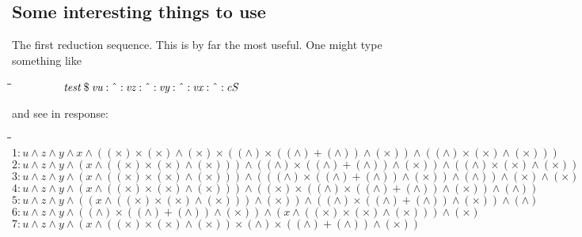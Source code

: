 \documentclass{article}
\newlength{\lwidth}\setlength{\lwidth}{4.5cm}
\newlength{\cwidth}\setlength{\cwidth}{8mm} %
\newcommand{\Varid}[1]{\mathit{#1}}
\begin{document}
\subsection{Some interesting things to use}

The first reduction sequence. This is by far the most useful. One might type something like
\begin{tabbing}
\qquad\=\hspace{\lwidth}\=\hspace{\cwidth}\=\+\kill
${\phantom{\Varid{nodups}\;(\Varid{x}\mbox{}}\Varid{test}\mathbin{\$}\Varid{vu}\mathbin{:\char94 :}\Varid{vz}\mathbin{:\char94 :}\Varid{vy}\mathbin{:\char94 :}\Varid{vx}\mathbin{:\char94 :}\Varid{cS}}$
\end{tabbing}and see in response:
\begin{tabbing}
\qquad\=\hspace{\lwidth}\=\hspace{\cwidth}\=\+\kill
${\mathrm{1}\mathbin{:}\Varid{u}\wedge\Varid{z}\wedge\Varid{y}\wedge\Varid{x}\wedge((\times)\times(\times)\wedge(\times)\times((\wedge)\times((\wedge)\mathbin{+}(\wedge))\wedge(\times))\wedge((\wedge)\times(\times)\wedge(\times)))}$\\
${\mathrm{2}\mathbin{:}\Varid{u}\wedge\Varid{z}\wedge\Varid{y}\wedge(\Varid{x}\wedge((\times)\times(\times)\wedge(\times)))\wedge((\wedge)\times((\wedge)\mathbin{+}(\wedge))\wedge(\times))\wedge((\wedge)\times(\times)\wedge(\times))}$\\
${\mathrm{3}\mathbin{:}\Varid{u}\wedge\Varid{z}\wedge\Varid{y}\wedge(\Varid{x}\wedge((\times)\times(\times)\wedge(\times)))\wedge(((\wedge)\times((\wedge)\mathbin{+}(\wedge))\wedge(\times))\wedge(\wedge))\wedge(\times)\wedge(\times)}$\\
${\mathrm{4}\mathbin{:}\Varid{u}\wedge\Varid{z}\wedge\Varid{y}\wedge(\Varid{x}\wedge((\times)\times(\times)\wedge(\times)))\wedge((\times)\times((\wedge)\times((\wedge)\mathbin{+}(\wedge))\wedge(\times))\wedge(\wedge))}$\\
${\mathrm{5}\mathbin{:}\Varid{u}\wedge\Varid{z}\wedge\Varid{y}\wedge((\Varid{x}\wedge((\times)\times(\times)\wedge(\times)))\wedge(\times))\wedge((\wedge)\times((\wedge)\mathbin{+}(\wedge))\wedge(\times))\wedge(\wedge)}$\\
${\mathrm{6}\mathbin{:}\Varid{u}\wedge\Varid{z}\wedge\Varid{y}\wedge((\wedge)\times((\wedge)\mathbin{+}(\wedge))\wedge(\times))\wedge(\Varid{x}\wedge((\times)\times(\times)\wedge(\times)))\wedge(\times)}$\\
${\mathrm{7}\mathbin{:}\Varid{u}\wedge\Varid{z}\wedge\Varid{y}\wedge(\Varid{x}\wedge((\times)\times(\times)\wedge(\times))\times(\wedge)\times((\wedge)\mathbin{+}(\wedge))\wedge(\times))}$\\

\end{tabbing}
\end{document}
